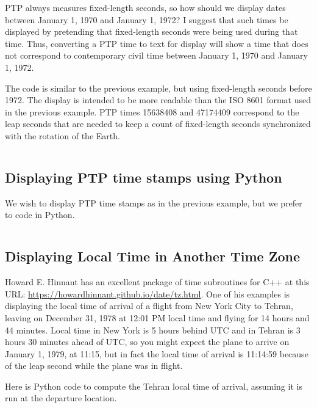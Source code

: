 \documentclass[letterpaper,twoside]{article}
\begin{document}
PTP always measures fixed-length seconds, so how should we display
dates between January 1, 1970 and January 1, 1972?  I suggest that
such times be displayed by pretending that fixed-length seconds
were being used during that time.  Thus, converting a PTP time
to text for display will show a time that does not correspond to
contemporary civil time between January 1, 1970 and January 1, 1972.

The code is similar to the previous example, but using
fixed-length seconds before 1972.  The display is intended to be
more readable than the ISO 8601 format used in the previous example.
PTP times \num{15638408} and \num{47174409} correspond to the leap
seconds that are needed to keep a count of fixed-length seconds
synchronized with the rotation of the Earth.

\inputminted[firstline=41,lastline=74]{c}{examples/example_05.c}

\subsection{Displaying PTP time stamps using Python}
\label{example:PTP_using_Python}
We wish to display PTP time stamps as in the previous example,
but we prefer to code in Python.

\inputminted[firstline=27,lastline=71]{Python}{examples/example_06.py}

\subsection{Displaying Local Time in Another Time Zone}
Howard E. Hinnant has an excellent package of time subroutines
for C++ at this URL:
\href{https://howardhinnant.github.io/date/tz.html}{https://howardhinnant.github.io/date/tz.html}.
One of his examples is displaying the local time of arrival of a flight
from New York City to Tehran, leaving on December 31, 1978 at 12:01 PM
local time and flying for 14 hours and 44 minutes.  Local time in
New York is 5 hours behind UTC and in Tehran is 3 hours 30 minutes
ahead of UTC, so you might expect the plane to arrive on
January 1, 1979, at 11:15, but in fact the local time of arrival
is 11:14:59 because of the leap second while the plane was in flight.

Here is Python code to compute the Tehran local time of arrival,
assuming it is run at the departure location.
\end{document}
